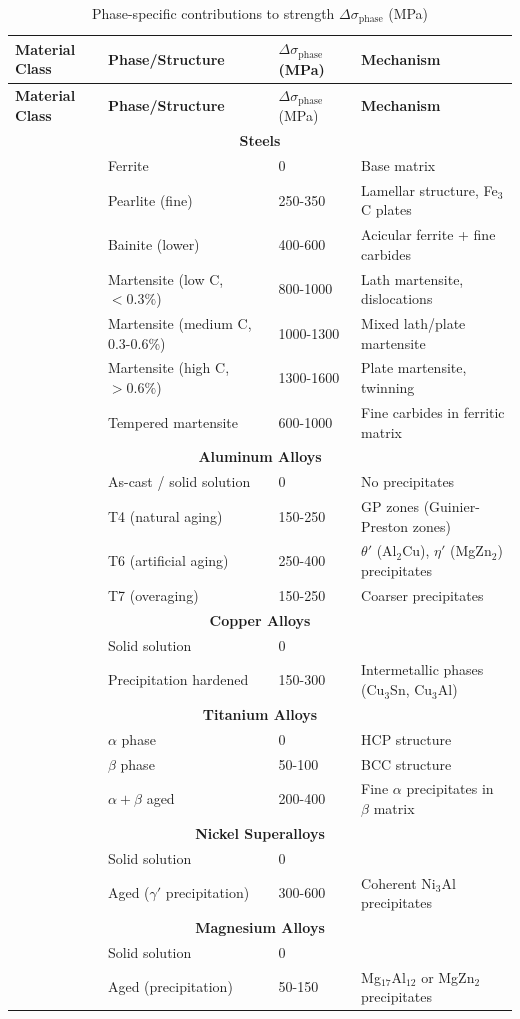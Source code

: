 \documentclass[12pt,a4paper]{article}
\begin{document}
	\begin{longtable}{p{3.5cm} p{3.0cm} p{3.0cm} p{4cm}}
		\caption{Phase-specific contributions to strength $\Delta\sigma_{\text{phase}}$ (MPa)}\label{tab:phase_contrib}\\
		\toprule
		\textbf{Material Class} & \textbf{Phase/Structure} & $\Delta\sigma_{\text{phase}}$ (MPa) & \textbf{Mechanism} \\
		\midrule
		\endfirsthead
		\toprule
		\textbf{Material Class} & \textbf{Phase/Structure} & $\Delta\sigma_{\text{phase}}$ (MPa) & \textbf{Mechanism} \\
		\midrule
		\endhead
		\multicolumn{4}{c}{\textbf{Steels}} \\
		& Ferrite & 0 & Base matrix \\
		& Pearlite (fine) & 250-350 & Lamellar structure, Fe$_3$C plates \\
		& Bainite (lower) & 400-600 & Acicular ferrite + fine carbides \\
		& Martensite (low C, $<0.3\%$) & 800-1000 & Lath martensite, dislocations \\
		& Martensite (medium C, 0.3-0.6\%) & 1000-1300 & Mixed lath/plate martensite \\
		& Martensite (high C, $>0.6\%$) & 1300-1600 & Plate martensite, twinning \\
		& Tempered martensite & 600-1000 & Fine carbides in ferritic matrix \\
		\hline
		\multicolumn{4}{c}{\textbf{Aluminum Alloys}} \\
		& As-cast / solid solution & 0 & No precipitates \\
		& T4 (natural aging) & 150-250 & GP zones (Guinier-Preston zones) \\
		& T6 (artificial aging) & 250-400 & $\theta'$ (Al$_2$Cu), $\eta'$ (MgZn$_2$) precipitates \\
		& T7 (overaging) & 150-250 & Coarser precipitates \\
		\hline
		\multicolumn{4}{c}{\textbf{Copper Alloys}} \\
		& Solid solution & 0 & \\
		& Precipitation hardened & 150-300 & Intermetallic phases (Cu$_3$Sn, Cu$_3$Al) \\
		\hline
		\multicolumn{4}{c}{\textbf{Titanium Alloys}} \\
		& $\alpha$ phase & 0 & HCP structure \\
		& $\beta$ phase & 50-100 & BCC structure \\
		& $\alpha+\beta$ aged & 200-400 & Fine $\alpha$ precipitates in $\beta$ matrix \\
		\hline
		\multicolumn{4}{c}{\textbf{Nickel Superalloys}} \\
		& Solid solution & 0 & \\
		& Aged ($\gamma'$ precipitation) & 300-600 & Coherent Ni$_3$Al precipitates \\
		\hline
		\multicolumn{4}{c}{\textbf{Magnesium Alloys}} \\
		& Solid solution & 0 & \\
		& Aged (precipitation) & 50-150 & Mg$_{17}$Al$_{12}$ or MgZn$_2$ precipitates \\
		\bottomrule
	\end{longtable}
	
\end{document}
